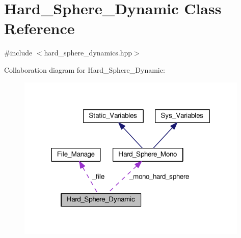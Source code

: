 \hypertarget{class_hard___sphere___dynamic}{}\section{Hard\+\_\+\+Sphere\+\_\+\+Dynamic Class Reference}
\label{class_hard___sphere___dynamic}


{\ttfamily \#include $<$hard\+\_\+sphere\+\_\+dynamics.\+hpp$>$}



Collaboration diagram for Hard\+\_\+\+Sphere\+\_\+\+Dynamic\+:\nopagebreak
\begin{figure}[H]
\begin{center}
\leavevmode
\includegraphics[width=313pt]{class_hard___sphere___dynamic__coll__graph}
\end{center}
\end{figure}
